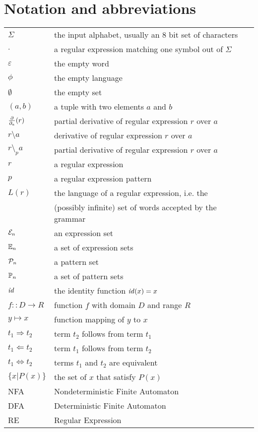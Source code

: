 \chapter*{Notation and abbreviations}


\begin{tabular}{ll}
   $\Sigma$ & the input alphabet, usually an 8 bit set of characters \\
   $.$ & a regular expression matching one symbol out of $\Sigma$ \\
   $\varepsilon$ & the empty word \\
   $\phi$ & the empty language \\
   $\emptyset$ & the empty set \\
   $(a,b)$ & a tuple with two elements $a$ and $b$ \\
   $\frac{\partial}{\partial_{a}}(r)$ & partial derivative of regular expression $r$ over $a$ \\
   $r \setminus a$ & derivative of regular expression $r$ over $a$ \\
   $r \setminus_p a$ & partial derivative of regular expression $r$ over $a$ \\
   $r$ & a regular expression \\
   $p$ & a regular expression pattern \\
   $L(r)$ & the language of a regular expression, i.e. the \\
          & (possibly infinite) set of words accepted by the grammar \\
   $\mathcal{E}_n$ & an expression set \\
   $\mathbb{E}_n$ & a set of expression sets \\
   $\mathcal{P}_n$ & a pattern set \\
   $\mathbb{P}_n$ & a set of pattern sets \\
   $\mathit{id}$ & the identity function $\mathit{id}(x) = x$ \\
   $f :: D \to R$ & function $f$ with domain $D$ and range $R$ \\
   $y \mapsto x$ & function mapping of $y$ to $x$ \\
   $t_1 \Rightarrow t_2$ & term $t_2$ follows from term $t_1$ \\
   $t_1 \Leftarrow t_2$ & term $t_1$ follows from term $t_2$ \\
   $t_1 \Leftrightarrow t_2$ & terms $t_1$ and $t_2$ are equivalent \\
   $\{ x | P(x) \}$ & the set of $x$ that satisfy $P(x)$ \\
   NFA & Nondeterministic Finite Automaton \\
   DFA & Deterministic Finite Automaton \\
   RE & Regular Expression \\
\end{tabular}


